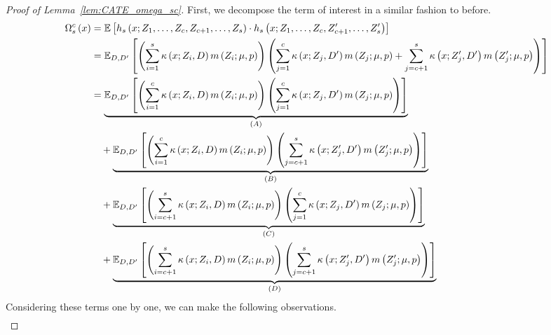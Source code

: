 \begin{proof}[Proof of Lemma~\ref{lem:CATE_omega_sc}]
    First, we decompose the term of interest in a similar fashion to before.
	\begin{equation}
        \begin{aligned}
            \Omega_{s}^{c}\left(x\right)
		    & = \mathbb{E}\left[h_{s}\left(x; Z_1, \ldots, Z_{c}, Z_{c+1}, \ldots, Z_{s}\right) \cdot
			h_{s}\left(x; Z_1, \ldots,Z_{c}, Z_{c+1}^{\prime}, \ldots, Z_{s}^{\prime}\right)\right]\\
            & = \mathbb{E}_{D, D^{\prime}}\left[
                \left(\sum_{i = 1}^{s} \kappa\left(x; Z_{i}, D\right) m\left(Z_{i}; \mu, p\right)\right) 
                \left(\sum_{j = 1}^{c} \kappa\left(x; Z_{j}, D^{\prime}\right) m\left(Z_{j}; \mu, p\right) + \sum_{j = c + 1}^{s} \kappa\left(x; Z_{j}^{\prime}, D^{\prime}\right) m\left(Z_{j}^{\prime}; \mu, p\right)\right)
            \right]\\
            & = \underbrace{\mathbb{E}_{D, D^{\prime}}\left[\left(\sum_{i = 1}^{c} \kappa\left(x; Z_{i}, D\right) m\left(Z_{i}; \mu, p\right)\right)
            \left(\sum_{j = 1}^{c} \kappa\left(x; Z_{j}, D^{\prime}\right) m\left(Z_{j}; \mu, p\right)\right)\right]}_{(A)} \\
            & \quad + \underbrace{\mathbb{E}_{D, D^{\prime}}\left[\left(\sum_{i = 1}^{c} \kappa\left(x; Z_{i}, D\right) m\left(Z_{i}; \mu, p\right)\right)
            \left(\sum_{j = c + 1}^{s} \kappa\left(x; Z_{j}^{\prime}, D^{\prime}\right) m\left(Z_{j}^{\prime}; \mu, p\right)\right)\right]}_{(B)} \\
            & \quad + \underbrace{\mathbb{E}_{D, D^{\prime}}\left[\left(\sum_{i = c + 1}^{s} \kappa\left(x; Z_{i}, D\right) m\left(Z_{i}; \mu, p\right)\right)
            \left(\sum_{j = 1}^{c} \kappa\left(x; Z_{j}, D^{\prime}\right) m\left(Z_{j}; \mu, p\right)\right)\right]}_{(C)} \\
            & \quad + \underbrace{\mathbb{E}_{D, D^{\prime}}\left[\left(\sum_{i = c + 1}^{s} \kappa\left(x; Z_{i}, D\right) m\left(Z_{i}; \mu, p\right)\right)
            \left(\sum_{j = c + 1}^{s} \kappa\left(x; Z_{j}^{\prime}, D^{\prime}\right) m\left(Z_{j}^{\prime}; \mu, p\right)\right)\right]}_{(D)} 
        \end{aligned}
    \end{equation}
    Considering these terms one by one, we can make the following observations.
    \begin{equation}
        \begin{aligned}

\end{aligned}
\end{equation}
\end{proof}
